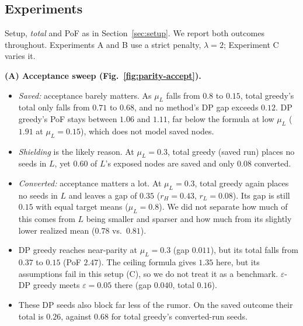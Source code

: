 
\subsection{Experiments}\label{sec:parity-exp}
Setup, \emph{total} and PoF as in Section~\ref{sec:setup}. We report both outcomes throughout. Experiments A and B use a strict penalty, $\lambda=2$; Experiment C varies it.

\textbf{(A) Acceptance sweep (Fig.~\ref{fig:parity-accept}).}
\begin{itemize}
\item \emph{Saved:} acceptance barely matters. As $\mu_L$ falls from $0.8$ to $0.15$, total greedy's total only falls from $0.71$ to $0.68$, and no method's DP gap exceeds $0.12$. DP greedy's PoF stays between $1.06$ and $1.11$, far below the formula at low $\mu_L$ ($1.91$ at $\mu_L=0.15$), which does not model saved nodes.
\item \emph{Shielding} is the likely reason. At $\mu_L=0.3$, total greedy (saved run) places no seeds in $L$, yet $0.60$ of $L$'s exposed nodes are saved and only $0.08$ converted.
\item \emph{Converted:} acceptance matters a lot. At $\mu_L=0.3$, total greedy again places no seeds in $L$ and leaves a gap of $0.35$ ($r_H=0.43$, $r_L=0.08$). Its gap is still $0.15$ with equal target means ($\mu_L=0.8$). We did not separate how much of this comes from $L$ being smaller and sparser and how much from its slightly lower realized mean ($0.78$ vs.\ $0.81$).
\item DP greedy reaches near-parity at $\mu_L=0.3$ (gap $0.011$), but its total falls from $0.37$ to $0.15$ (PoF $2.47$). The ceiling formula gives $1.35$ here, but its assumptions fail in this setup (C), so we do not treat it as a benchmark. $\varepsilon$-DP greedy meets $\varepsilon=0.05$ there (gap $0.040$, total $0.16$).
\item These DP seeds also block far less of the rumor. On the saved outcome their total is $0.26$, against $0.68$ for total greedy's converted-run seeds.
\end{itemize}


